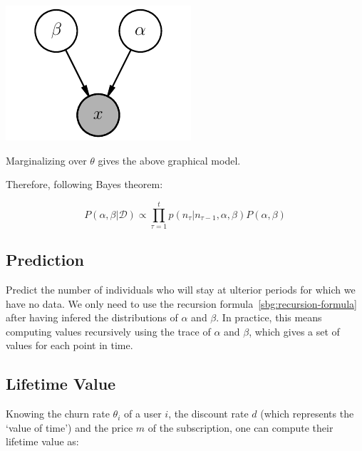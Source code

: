 \documentclass{tufte-book}
\begin{document}
\begin{marginfigure}
  \centering
  \includegraphics[width=\linewidth]{./figures/shifted_beta_geometric_marginalized.pdf}
  \caption{Marginalizing over $\theta$ gives the above graphical model. \label{fig:sbg}}
\end{marginfigure}

Therefore, following Bayes theorem:

\begin{equation}
  P(\alpha, \beta | \mathcal{D}) \propto \prod_{\tau=1}^t p(n_\tau|n_{\tau-1}, \alpha, \beta) P(\alpha, \beta)
\end{equation}


  \subsection{Prediction}%
  \label{sub:prediction}

Predict the number of individuals who will stay at ulterior periods for which we have no data. We only need to
use the recursion formula~\ref{sbg:recursion-formula} after having infered the distributions of $\alpha$ and
$\beta$. In practice, this means computing values recursively using the trace of $\alpha$ and $\beta$, which
gives a set of values for each point in time.

  
  \subsection{Lifetime Value}%
  \label{sub:lifetime_value}
  
Knowing the churn rate $\theta_i$ of a user $i$, the discount rate $d$ (which represents the `value of
time') and the price $m$ of the subscription, one can compute their lifetime value as:
\end{document}
